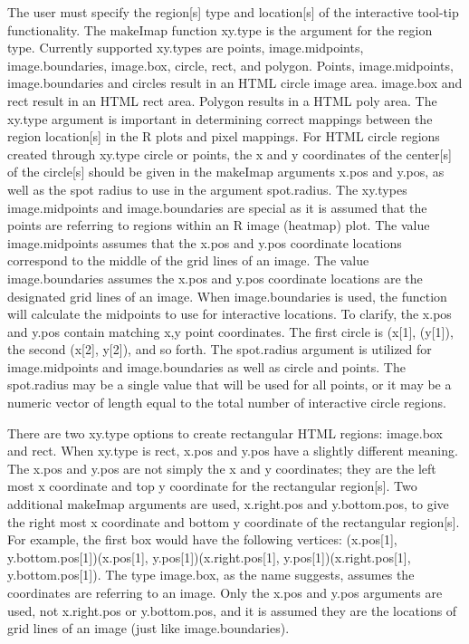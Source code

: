 \documentclass[]{article}
\begin{document}
\indent The user must specify the region[s] type and location[s] of the interactive tool-tip functionality. The makeImap function xy.type is the argument for the region type. Currently supported xy.types are points, image.midpoints, image.boundaries, image.box, circle, rect, and polygon. Points, image.midpoints, image.boundaries and circles result in an HTML circle image area. image.box and rect result in an HTML rect area. Polygon results in a HTML poly area. The xy.type argument is important in determining correct mappings between the region location[s] in the R plots and pixel mappings. For HTML circle regions created through xy.type circle or points, the x and y coordinates of the center[s] of the circle[s] should be given in the makeImap arguments x.pos and y.pos, as well as the spot radius to use in the argument spot.radius. The xy.types image.midpoints and image.boundaries are special as it is assumed that the points are referring to regions within an R image (heatmap) plot. The value image.midpoints assumes that the x.pos and y.pos coordinate locations correspond to the middle of the grid lines of an image. The value image.boundaries assumes the x.pos and y.pos coordinate locations are the designated grid lines of an image. When image.boundaries is used, the function will calculate the midpoints to use for interactive locations. To clarify, the x.pos and y.pos contain matching x,y point coordinates. The first circle is (x[1], (y[1]), the second (x[2], y[2]), and so forth. The spot.radius argument is utilized for image.midpoints and image.boundaries as well as circle and points. The spot.radius may be a single value that will be used for all points, or it may be a numeric vector of length equal to the total number of interactive circle regions. \newline

\indent There are two xy.type options to create rectangular HTML regions: image.box and rect. When xy.type is rect, x.pos and y.pos have a slightly different meaning. The x.pos and y.pos are not simply the x and y coordinates; they are the left most x coordinate and top y coordinate for the rectangular region[s]. Two additional makeImap arguments are used, x.right.pos and y.bottom.pos, to give the right most x coordinate and bottom y coordinate of the rectangular region[s]. For example, the first box would have the following vertices: (x.pos[1], y.bottom.pos[1])(x.pos[1], y.pos[1])(x.right.pos[1], y.pos[1])(x.right.pos[1], y.bottom.pos[1]). The type image.box, as the name suggests, assumes the coordinates are referring to an image. Only the x.pos and y.pos arguments are used, not x.right.pos or y.bottom.pos, and it is assumed they are the locations of grid lines of an image (just like image.boundaries).\newline
\end{document}
